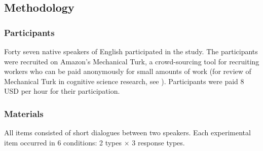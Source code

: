 \documentclass[output=paper]{langsci/langscibook}
\begin{document}
\subsection{Methodology}

\subsubsection{Participants}


Forty seven native speakers of English participated in the study. The participants were recruited on Amazon's Mechanical Turk, a crowd-sourcing tool for recruiting workers who can be paid anonymously for small amounts of work (for review of Mechanical Turk in cognitive science research, see \citealt{MunroEtAl2010}).  Participants were paid 8 USD per hour for their participation.

\subsubsection{Materials}

All items consisted of short dialogues between two speakers. Each experimental item occurred in 6 conditions: 2  types $\times$ 3 response types.

\end{document}
